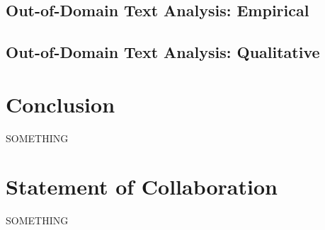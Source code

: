 \documentclass[11pt,a4paper]{article}
\begin{document}

\subsection{Out-of-Domain Text Analysis: Empirical}%
\label{sec:out_domain_text_analysis_empirical}


\subsection{Out-of-Domain Text Analysis: Qualitative}%
\label{sub:out_domain_text_analysis_qualitative}



\section{Conclusion}%
\label{sec:conclusion}

SOMETHING




\section{Statement of Collaboration}
SOMETHING






\appendix
\end{document}
